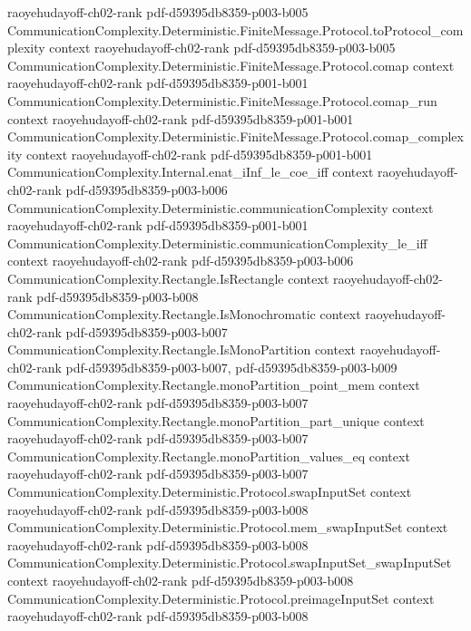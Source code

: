 \begin{theorem}
  {raoyehudayoff-ch02-rank}
  {pdf-d59395db8359-p003-b005}
\proofstep
  {CommunicationComplexity.Deterministic.FiniteMessage.Protocol.toProtocol_complexity}
  {context}
  {raoyehudayoff-ch02-rank}
  {pdf-d59395db8359-p003-b005}
\proofstep
  {CommunicationComplexity.Deterministic.FiniteMessage.Protocol.comap}
  {context}
  {raoyehudayoff-ch02-rank}
  {pdf-d59395db8359-p001-b001}
\proofstep
  {CommunicationComplexity.Deterministic.FiniteMessage.Protocol.comap_run}
  {context}
  {raoyehudayoff-ch02-rank}
  {pdf-d59395db8359-p001-b001}
\proofstep
  {CommunicationComplexity.Deterministic.FiniteMessage.Protocol.comap_complexity}
  {context}
  {raoyehudayoff-ch02-rank}
  {pdf-d59395db8359-p001-b001}
\proofstep
  {CommunicationComplexity.Internal.enat_iInf_le_coe_iff}
  {context}
  {raoyehudayoff-ch02-rank}
  {pdf-d59395db8359-p003-b006}
\proofstep
  {CommunicationComplexity.Deterministic.communicationComplexity}
  {context}
  {raoyehudayoff-ch02-rank}
  {pdf-d59395db8359-p001-b001}
\proofstep
  {CommunicationComplexity.Deterministic.communicationComplexity_le_iff}
  {context}
  {raoyehudayoff-ch02-rank}
  {pdf-d59395db8359-p003-b006}
\proofstep
  {CommunicationComplexity.Rectangle.IsRectangle}
  {context}
  {raoyehudayoff-ch02-rank}
  {pdf-d59395db8359-p003-b008}
\proofstep
  {CommunicationComplexity.Rectangle.IsMonochromatic}
  {context}
  {raoyehudayoff-ch02-rank}
  {pdf-d59395db8359-p003-b007}
\proofstep
  {CommunicationComplexity.Rectangle.IsMonoPartition}
  {context}
  {raoyehudayoff-ch02-rank}
  {pdf-d59395db8359-p003-b007,
    pdf-d59395db8359-p003-b009}
\proofstep
  {CommunicationComplexity.Rectangle.monoPartition_point_mem}
  {context}
  {raoyehudayoff-ch02-rank}
  {pdf-d59395db8359-p003-b007}
\proofstep
  {CommunicationComplexity.Rectangle.monoPartition_part_unique}
  {context}
  {raoyehudayoff-ch02-rank}
  {pdf-d59395db8359-p003-b007}
\proofstep
  {CommunicationComplexity.Rectangle.monoPartition_values_eq}
  {context}
  {raoyehudayoff-ch02-rank}
  {pdf-d59395db8359-p003-b007}
\proofstep
  {CommunicationComplexity.Deterministic.Protocol.swapInputSet}
  {context}
  {raoyehudayoff-ch02-rank}
  {pdf-d59395db8359-p003-b008}
\proofstep
  {CommunicationComplexity.Deterministic.Protocol.mem_swapInputSet}
  {context}
  {raoyehudayoff-ch02-rank}
  {pdf-d59395db8359-p003-b008}
\proofstep
  {CommunicationComplexity.Deterministic.Protocol.swapInputSet_swapInputSet}
  {context}
  {raoyehudayoff-ch02-rank}
  {pdf-d59395db8359-p003-b008}
\proofstep
  {CommunicationComplexity.Deterministic.Protocol.preimageInputSet}
  {context}
  {raoyehudayoff-ch02-rank}
  {pdf-d59395db8359-p003-b008}

\end{theorem}
